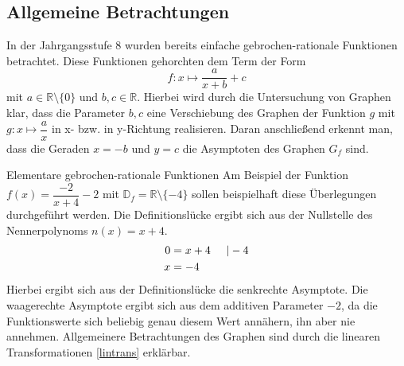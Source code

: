 \subsection{Allgemeine Betrachtungen}
\label{elemgebrat}In der Jahrgangsstufe 8 wurden bereits einfache gebrochen-rationale Funktionen betrachtet. Diese Funktionen gehorchten dem Term der Form $$f: x\mapsto \dfrac{a}{x+b} +c$$ mit $a \in \mathds{R}\setminus\{0\}$ und $b,c\in\mathds{R}$. Hierbei wird durch die Untersuchung von Graphen klar, dass die Parameter $b,c$ eine Verschiebung des Graphen der Funktion $g$ mit $g:x\mapsto \dfrac{a}{x}$ in x- bzw. in y-Richtung realisieren. Daran anschließend erkennt man, dass die Geraden $x=-b$ und $y=c$ die Asymptoten des Graphen $G_f$ sind. 
\begin{bsp}{Elementare gebrochen-rationale Funktionen}{}
Am Beispiel der Funktion $f(x) = \dfrac{-2}{x+4} - 2$ mit $\mathds{D}_f = \mathds{R}\setminus\{-4\}$ sollen beispielhaft diese Überlegungen durchgeführt werden. Die Definitionslücke ergibt sich aus der Nullstelle des Nennerpolynoms $n(x) = x+4$. 
 \begin{equation*}
    \begin{split}
        0 &= x+4 \hspace{0.5 cm} | -4\\
        x&=-4 
       \end{split}
\end{equation*}
Hierbei ergibt sich aus der Definitionslücke die senkrechte Asymptote. Die waagerechte Asymptote ergibt sich aus dem additiven Parameter $-2$, da die Funktionswerte sich beliebig genau diesem Wert annähern, ihn aber nie annehmen. Allgemeinere Betrachtungen des Graphen sind durch die linearen Transformationen \ref{lintrans} erklärbar.
\begin{center}
\end{center}
\end{bsp}
